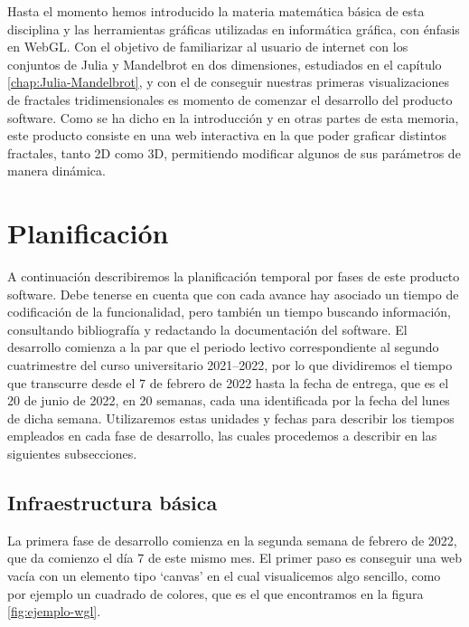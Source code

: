 %
%

Hasta el momento hemos introducido la materia matemática básica de esta disciplina y las herramientas gráficas utilizadas en informática gráfica, con énfasis en WebGL. Con el objetivo de familiarizar al usuario de internet con los conjuntos de Julia y Mandelbrot en dos dimensiones, estudiados en el capítulo \ref{chap:Julia-Mandelbrot}, y con el de conseguir nuestras primeras visualizaciones de fractales tridimensionales es momento de comenzar el desarrollo del producto software. Como se ha dicho en la introducción y en otras partes de esta memoria, este producto consiste en una web interactiva en la que poder graficar distintos fractales, tanto 2D como 3D, permitiendo modificar algunos de sus parámetros de manera dinámica.  

\section{Planificación}

A continuación describiremos la planificación temporal por fases de este producto software. Debe tenerse en cuenta que con cada avance hay asociado un tiempo de codificación de la funcionalidad, pero también un tiempo buscando información, consultando bibliografía y redactando la documentación del software. El desarrollo comienza a la par que el periodo lectivo correspondiente al segundo cuatrimestre del curso universitario 2021--2022, por lo que dividiremos el tiempo que transcurre desde el 7 de febrero de 2022 hasta la fecha de entrega, que es el 20 de junio de 2022, en 20 semanas, cada una identificada por la fecha del lunes de dicha semana. Utilizaremos estas unidades y fechas para describir los tiempos empleados en cada fase de desarrollo, las cuales procedemos a describir en las siguientes subsecciones.

\subsection{Infraestructura básica}

La primera fase de desarrollo comienza en la segunda semana de febrero de 2022, que da comienzo el día 7 de este mismo mes. El primer paso es conseguir una web vacía con un elemento tipo `canvas' en el cual visualicemos algo sencillo, como por ejemplo un cuadrado de colores, que es el que encontramos en la figura \ref{fig:ejemplo-wgl}.

